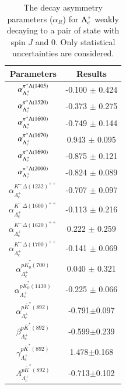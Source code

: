 \begin{table}[h]
    \centering
    \caption{The decay asymmetry parameters ($\alpha_R$) for $\Lambda_{c}^{+}$ weakly decaying to a pair of state with spin $J$ and 0. Only statistical uncertainties are considered.}
    \label{tab:fit_asymmetry}
    \begin{tabular}{cc}
        \hline\hline
    Parameters  & Results \\\hline
    $ \alpha_{\Lambda_c^+}^{\pi^+\Lambda(1405)} $ &  -0.100 $\pm$ 0.424 \\
    $ \alpha_{\Lambda_c^+}^{\pi^+\Lambda(1520)} $ &  -0.373 $\pm$ 0.275 \\
    $ \alpha_{\Lambda_c^+}^{\pi^+\Lambda(1600)} $ &  -0.749 $\pm$ 0.144 \\
    $ \alpha_{\Lambda_c^+}^{\pi^+\Lambda(1670)} $ &  0.943 $\pm$ 0.095 \\
    $ \alpha_{\Lambda_c^+}^{\pi^+\Lambda(1690)} $ &  -0.875 $\pm$ 0.121 \\
    $ \alpha_{\Lambda_c^+}^{\pi^+\Lambda(2000)} $ &  -0.824 $\pm$ 0.089 \\
    $ \alpha_{\Lambda_c^+}^{K^-\Delta(1232)^{++}} $ &  -0.707 $\pm$ 0.097 \\
    $ \alpha_{\Lambda_c^+}^{K^-\Delta(1600)^{++}} $ &  -0.113 $\pm$ 0.216 \\
    $ \alpha_{\Lambda_c^+}^{K^-\Delta(1620)^{++}} $ &  0.222 $\pm$ 0.259 \\
    $ \alpha_{\Lambda_c^+}^{K^-\Delta(1700)^{++}} $ &  -0.141 $\pm$ 0.069 \\
    $ \alpha_{\Lambda_c^+}^{p\overline{K}^{*}_{0}(700)} $ &  0.040 $\pm$ 0.321 \\
    $ \alpha_{\Lambda_c^+}^{p\overline{K}^{*}_{0}(1430)} $ &  -0.225 $\pm$ 0.066 \\
    $\alpha_{\Lambda_c^+}^{p\overline{K}^*(892)}$ & -0.791$\pm$0.097\\
    $\beta_{\Lambda_c^+}^{p\overline{K}^*(892)}$ & -0.599$\pm$0.239\\
    $\gamma_{\Lambda_c^+}^{p\overline{K}^*(892)}$ & 1.478$\pm$0.168\\
    $\Lambda_{\Lambda_c^+}^{p\overline{K}^*(892)}$ & -0.713$\pm$0.102\\
    \hline\hline
    \end{tabular}
\end{table}

